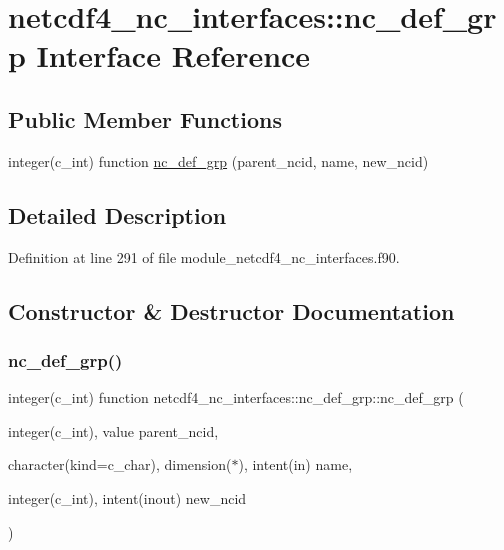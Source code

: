 \hypertarget{interfacenetcdf4__nc__interfaces_1_1nc__def__grp}{}\section{netcdf4\+\_\+nc\+\_\+interfaces\+:\+:nc\+\_\+def\+\_\+grp Interface Reference}
\label{interfacenetcdf4__nc__interfaces_1_1nc__def__grp}
\subsection*{Public Member Functions}
\begin{DoxyCompactItemize}
\item 
integer(c\+\_\+int) function \hyperlink{interfacenetcdf4__nc__interfaces_1_1nc__def__grp_ae0b5ea5c24a1d6f16908b0a5c150b613}{nc\+\_\+def\+\_\+grp} (parent\+\_\+ncid, name, new\+\_\+ncid)
\end{DoxyCompactItemize}


\subsection{Detailed Description}


Definition at line 291 of file module\+\_\+netcdf4\+\_\+nc\+\_\+interfaces.\+f90.



\subsection{Constructor \& Destructor Documentation}
\mbox{\label{interfacenetcdf4__nc__interfaces_1_1nc__def__grp_ae0b5ea5c24a1d6f16908b0a5c150b613}} 
\subsubsection{\texorpdfstring{nc\+\_\+def\+\_\+grp()}{nc\_def\_grp()}}
{\footnotesize\ttfamily integer(c\+\_\+int) function netcdf4\+\_\+nc\+\_\+interfaces\+::nc\+\_\+def\+\_\+grp\+::nc\+\_\+def\+\_\+grp (\begin{DoxyParamCaption}\item[{integer(c\+\_\+int), value}]{parent\+\_\+ncid,  }\item[{character(kind=c\+\_\+char), dimension($\ast$), intent(in)}]{name,  }\item[{integer(c\+\_\+int), intent(inout)}]{new\+\_\+ncid }\end{DoxyParamCaption})}



